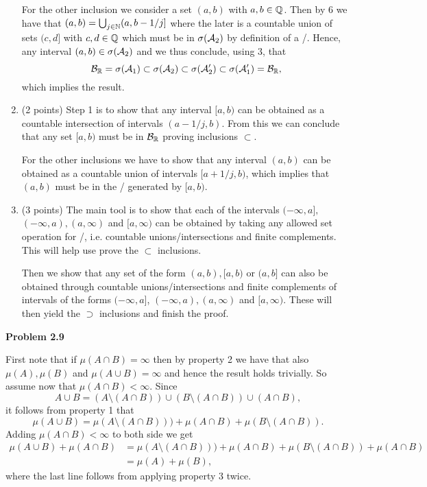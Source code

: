 \begin{enumerate}[label=(\alph*)]
For the other inclusion we consider a set $(a,b)$ with $a,b \in \mathbb Q$. Then by 6 we have that $(a,b) = \bigcup_{j \in \mathbb N} (a,b-1/j]$ where the later is a countable union of sets $(c,d]$ with $c,d \in \mathbb Q$ which must be in $\sigma(\mathcal A_2)$ by definition of a \sigalg/. Hence, any interval $(a,b) \in \sigma(\mathcal A_2)$ and we thus conclude, using 3, that
\[
	\mathcal B_{\mathbb R} = \sigma(\mathcal A_1) \subset \sigma(\mathcal A_2) \subset \sigma(\mathcal A_2^\prime) \subset \sigma(\mathcal A_1^\prime) = \mathcal B_{\mathbb R},
\]
which implies the result.
\item (2 points) Step 1 is to show that any interval $[a,b)$ can be obtained as a countable intersection of intervals $(a-1/j,b)$. From this we can conclude that any set $[a,b)$ must be in $\mathcal B_{\mathbb R}$ proving inclusions $\subset$.

For the other inclusions we have to show that any interval $(a,b)$ can be obtained as a countable union of intervals $[a+1/j, b)$, which implies that $(a,b)$ must be in the \sigalg/ generated by $[a,b)$. 
\item (3 points) The main tool is to show that each of the intervals $(-\infty, a],$ $(-\infty ,a), (a,\infty)$ and $[a,\infty)$ can be obtained by taking any allowed set operation for \sigalgs/, i.e. countable unions/intersections and finite complements. This will help use prove the $\subset$ inclusions. 

Then we show that any set of the form $(a,b), [a,b)$ or $(a,b]$ can also be obtained through countable unions/intersections and finite complements of intervals of the forms $(-\infty, a]$, $(-\infty ,a), (a,\infty)$ and $[a,\infty)$. These will then yield the $\supset$ inclusions and finish the proof.
\end{enumerate}

\bigskip

\textbf{Problem 2.9}

First note that if $\mu(A \cap B) = \infty$ then by property 2 we have that also $\mu(A), \mu(B)$ and $\mu(A \cup B) = \infty$ and hence the result holds trivially. So assume now that $\mu(A \cap B) < \infty$. Since 
\[
	A \cup B = (A \setminus (A\cap B)) \cup (B \setminus (A \cap B)) \cup (A \cap B),
\] 
it follows from property 1 that
\[
	\mu(A \cup B) = \mu(A \setminus (A \cap B))) + \mu(A \cap B) + \mu(B \setminus (A \cap B)).
\] 
Adding $\mu(A \cap B) < \infty$ to both side we get
\begin{align*}
	\mu(A \cup B) + \mu(A \cap B) 
	&= \mu(A \setminus (A \cap B))) + \mu(A \cap B) + \mu(B \setminus (A \cap B)) + \mu(A \cap B)\\
	&= \mu(A) + \mu(B), 
\end{align*}
where the last line follows from applying property 3 twice.  
 
